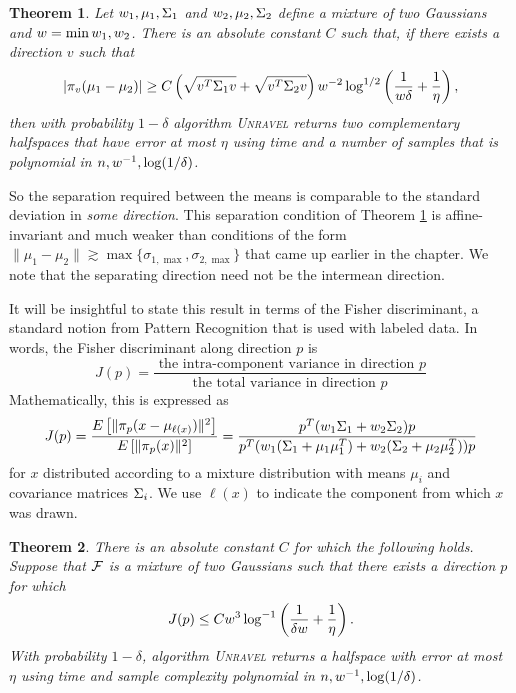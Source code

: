 \documentclass{book}
\newtheorem{theorem}{Theorem}[chapter]
\numberwithin{exercise}{chapter}
\begin{document}
\begin{theorem}\label{thrm:k=2-sep}
Let $w_1,{\mu}_1,{\Sigma}_1$ and $w_2,{\mu}_2,{\Sigma}_2$ define a mixture of
two Gaussians and $w = \min w_1,w_2$.  There is an absolute constant $C$ such that, if there
exists a direction $v$ such that
\[
|\pi_v (\mu_1 - \mu_2)| \geq C \left(\sqrt{v^T{\Sigma}_1v} + \sqrt{v^T{\Sigma}_2v}\right)
w^{-2} \log ^{1/2}\left( \frac{1}{w \delta} + \frac{1}{\eta}\right),
\]
then with probability $1-\delta$ algorithm \textsc{Unravel} returns
two complementary halfspaces that have error at most $\eta$ using
time and a number of samples that is polynomial in
$n,w^{-1},\log (1/\delta)$.
\end{theorem}
So the separation required between the means is comparable to the
standard deviation in {\em some direction}. This separation condition
of Theorem \ref{thrm:k=2-sep} is affine-invariant and much weaker than
conditions of the form $\| \mu_1 - \mu_2\| \gtrsim
\max\{\sigma_{1,\max}, \sigma_{2,\max}\}$ that came up earlier in the chapter.
We note that the separating direction need not be the intermean direction.

It will be insightful to state this result in terms of the Fisher
discriminant, a standard notion from Pattern Recognition
\cite{Duda2001,Fukunaga1990} that is used with labeled data.  In
words, the Fisher discriminant along direction $p$ is
\[
J(p) = \frac{\mbox{ the intra-component variance in direction $p$}}
{\mbox{the total variance in direction $p$}}
\]
Mathematically, this is expressed as
\[
J(p) = \frac{E\left[\| \pi_p(x - {\mu}_{\ell(x)})\|^2 \right]}
{E\left[\| \pi_p(x) \|^2 \right]} =
\frac{p^T( w_1 {\Sigma}_1 + w_2 {\Sigma}_2)p}
{p^T(w_1 ({\Sigma}_1 + {\mu}_1{\mu}_1^T) + w_2 ({\Sigma}_2 + {\mu}_2{\mu}_2^T))p}
\]
for $x$ distributed according to a mixture distribution with means
$\mu_i$ and covariance matrices ${\Sigma}_i$.  We use $\ell(x)$ to indicate
the component from which $x$ was drawn.

\begin{theorem}\label{thrm:k=2-fisher}
There is an absolute constant $C$ for which the following holds.
Suppose that ${\mathcal{F}}$ is a mixture of two Gaussians such that there
exists a direction $p$ for which
\[
J(p) \leq C w^3 \log^{-1} \left(\frac{1}{\delta w} +
\frac{1}{\eta}\right).
\]
With probability $1-\delta$, algorithm \textsc{Unravel} returns a
halfspace with error at most $\eta$  using time and sample complexity
polynomial in $n,w^{-1},\log(1/\delta)$.
\end{theorem}
\end{document}

